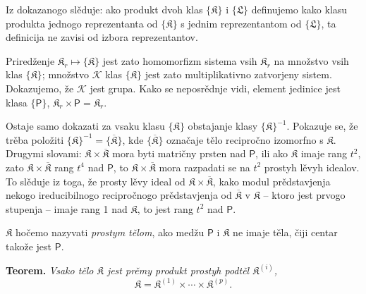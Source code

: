 \documentclass[11pt]{article}
\begin{document}
Iz dokazanogo slěduje: ako produkt dvoh klas \(\{\mathfrak K\}\) i \(\{\mathfrak L\}\) definujemo kako klasu produkta jednogo reprezentanta od \(\{\mathfrak K\}\) s jednim reprezentantom od \(\{\mathfrak L\}\), ta definicija ne zavisi od izbora reprezentantov.

Priredženje \(\mathfrak K_r\mapsto\{\mathfrak K\}\) jest zato homomorfizm sistema vsih \(\mathfrak K_r\) na množstvo vsih klas \(\{\mathfrak K\}\); množstvo \(\mathscr K\) klas \(\{\mathfrak K\}\) jest zato multiplikativno zatvorjeny sistem. Dokazujemo, že \(\mathscr K\) jest grupa. Kako se neposrědnje vidi, element jedinice jest klasa \(\{\mathsf P\}\), \(\mathfrak K_r\times\mathsf P=\mathfrak K_r\).

Ostaje samo dokazati za vsaku klasu \(\{\mathfrak K\}\) obstajanje klasy \(\{\mathfrak K\}^{-1}\). Pokazuje se, že trěba položiti \(\{\mathfrak K\}^{-1}=\{\overline{\mathfrak K}\}\), kde \(\{\overline{\mathfrak K}\}\) označaje tělo recipročno izomorfno s \(\mathfrak K\). Drugymi slovami: \(\mathfrak K\times\overline{\mathfrak K}\) mora byti matričny prsten nad \(\mathsf P\), ili ako \(\mathfrak K\) imaje rang \(t^2\), zato \(\mathfrak K\times\overline{\mathfrak K}\) rang \(t^4\) nad \(\mathsf P\), to \(\mathfrak K\times\overline{\mathfrak K}\) mora razpadati se na \(t^2\) prostyh lěvyh idealov. To slěduje iz toga, že prosty lěvy ideal od \(\mathfrak K\times\overline{\mathfrak K}\), kako modul prědstavjenja nekogo ireducibilnogo recipročnogo prědstavjenja od \(\overline{\mathfrak K}\) v \(\mathfrak K\) -- ktoro jest prvogo stupenja -- imaje rang 1 nad \(\mathfrak K\), to jest rang \(t^2\) nad \(\mathsf P\).

\(\mathfrak K\) hočemo nazyvati \emph{prostym tělom}, ako medžu \(\mathsf P\) i \(\mathfrak K\) ne imaje těla, čiji centar takože jest \(\mathsf P\).

\textbf{Teorem.} \emph{Vsako tělo \(\mathfrak K\) jest prěmy produkt prostyh podtěl \(\mathfrak K^{(i)}\),}
\[
\mathfrak K=\mathfrak K^{(1)}\times\cdots\times\mathfrak K^{(p)}.
\]
\end{document}
